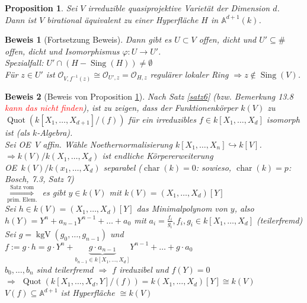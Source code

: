 \documentclass[a4paper,12pt]{report}
\theoremstyle{break}
\newtheorem{Prop}[Def]{Proposition}
\theoremstyle{nonumberbreak}
\newtheorem{Bew}{Beweis}
\theoremstyle{nonumberplain}
\DeclareMathOperator{\Quot}{Quot}
\DeclareMathOperator{\Sing}{Sing}
\DeclareMathOperator{\chara}{char}
\DeclareMathOperator{\kgv}{kgV}
\newcommand{\A}{\mathbb{A}}
\newcommand{\calO}{\mathcal{O}}
\renewcommand{\OE}{O\!\!E~}
\begin{document}
\begin{Prop}\label{19.8}
Sei $V$ irreduzible quasiprojektive Variet\"at der Dimension $d$.\\
Dann ist $V$ birational \"aquivalent zu einer Hyperfl\"ache $H$ in $\A^{d+1}(k)$.
\end{Prop}

\begin{Bew}[Fortsetzung Beweis]
Dann gibt es $U \subset V$ offen, dicht und $U'\subseteq \#$ offen, dicht und Isomorphismus $\varphi:U\to U'$.\\
Spezialfall: $U'\cap(H-\Sing(H))\ne \emptyset$\\
F\"ur $z\in U'$ ist $\calO_{V,f^{-1}(z)}\cong \calO_{U',z}=\calO_{H,z}$ regul\"arer lokaler Ring $\Rightarrow z\notin\Sing(V)$.
\end{Bew}

\begin{Bew}[Beweis von Proposition \ref{19.8}]
Nach Satz \ref{satz6} (bzw. Bemerkung 13.8 \textcolor{red}{kann das nicht finden}), ist zu zeigen, dass der Funktionenk\"orper $k(V)$ zu $\Quot(k[X_1,\ldots ,X_{d+1}]/(f))$ f\"ur ein irreduzibles $f\in k[X_1,\ldots ,X_d]$ isomorph ist (als $k$-Algebra).\\
Sei \OE $V$ affin. W\"ahle Noethernormalisierung $k[X_1,\ldots ,X_n]\hookrightarrow k[V]$.\\
$\Rightarrow k(V)/k(X_1,\ldots ,X_d)$ ist endliche K\"orpererweiterung\\
\OE $k(V)/k(x_1,\ldots ,X_d)$ separabel ($\chara(k)=0$: sowieso, $\chara(k)=p$: Bosch, 7.3, Satz 7)\\
$\overset{\text{Satz vom}}{\underset{\text{prim. Elem.}}{\Longrightarrow}}$ es gibt $y\in k(V)$ mit $k(V)=(X_1,\ldots ,X_d)[Y]$\\
Sei $h\in k(V)=(X_1,\ldots ,X_d)[Y]$ das Minimalpolynom von $y$, also $h(Y)=Y^n+a_{n-1}Y^{n-1}+\ldots +a_0$ mit $a_i=\frac{f_i}{g_i}, f_i, g_i \in k[X_1,\ldots ,X_d]$ (teilerfremd)\\
Sei $g=\kgv(g_0,\ldots ,g_{n-1})$ und $f:=g\cdot h= g\cdot Y^n+\underbrace{g\cdot a_{n-1}}_{b_{n-1}\in k[X_1,\ldots ,X_d]}Y^{n-1}+\ldots +g\cdot a_0$\\
$b_0,\ldots ,b_n$ sind teilerfremd $\Rightarrow$ $f$ ireduzibel und $f(Y)=0$\\
$\Rightarrow$ $\Quot(k[X_1,\ldots ,X_d,Y]/(f))=k(X_1,\ldots ,X_d)[Y]\cong k(V)$\\
$V(f)\subseteq\A^{d+1}$ ist Hyperfl\"ache $\cong k(V)$
\end{Bew}
\end{document}
